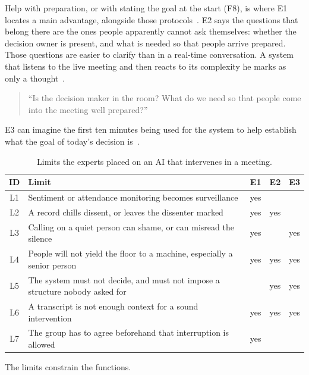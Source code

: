 Help with preparation, or with stating the goal at the start (F8), is where E1 locates a
main advantage, alongside those protocols~.
E2 says the questions that belong there are the ones people apparently cannot ask themselves:
whether the decision owner is present, and what is needed so that people arrive
prepared.
Those questions are easier to clarify than in a real-time conversation.
A system that listens to the live meeting and then reacts to its complexity he marks as only
a thought~.
{\setlength{\topsep}{0.25\baselineskip}\setlength{\partopsep}{0pt}%
  \begin{quote}\small
    \enquote{Is the decision maker in the room? What do we need so that people come into the
    meeting well prepared?}~
\end{quote}}
E3 can imagine the first ten minutes being used for the system to help establish what the
goal of today's decision is~.

\begin{table}[htbp]
  \centering
  \caption{Limits the experts placed on an AI that intervenes in a meeting.}
  \label{tab:interview-ai-limits}
  \footnotesize
  \begin{tabularx}{\textwidth}{@{}c>{\RaggedRight\arraybackslash}Xccc@{}}
    \toprule
    ID & Limit & E1 & E2 & E3 \\
    \midrule
    L1 & Sentiment or attendance monitoring becomes surveillance & yes &     &     \\
    L2 & A record chills dissent, or leaves the dissenter marked & yes & yes &     \\
    L3 & Calling on a quiet person can shame, or can misread the silence & yes &     & yes \\
    L4 & People will not yield the floor to a machine, especially a senior person & yes & yes & yes \\
    L5 & The system must not decide, and must not impose a structure nobody asked for &     & yes & yes \\
    L6 & A transcript is not enough context for a sound intervention & yes & yes & yes \\
    L7 & The group has to agree beforehand that interruption is allowed & yes &     &     \\
    \bottomrule
  \end{tabularx}
\end{table}

The limits constrain the functions.

